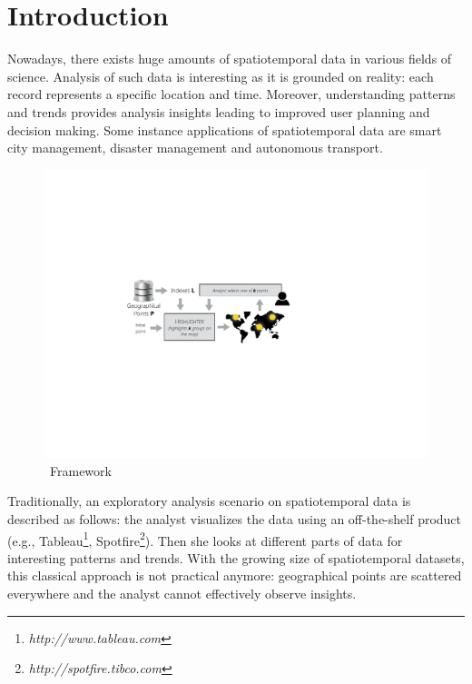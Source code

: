 \section{Introduction} 
Nowadays, there exists huge amounts of spatiotemporal data in various fields of science.
Analysis of such data is interesting as it is grounded
on reality: each record represents a specific location and time. Moreover, understanding patterns and trends provides analysis insights leading to improved user planning and decision making. Some instance applications of spatiotemporal data are smart city management, disaster management and autonomous transport.

\begin{figure}[t]
  \centering
  \includegraphics[width=\columnwidth]{figs/framework}
\caption{\framework\ Framework}
\label{fig:framework}
\vspace{-10pt}
\end{figure}

Traditionally, an exploratory analysis scenario on spatiotemporal data is described as follows: the analyst visualizes the data using an off-the-shelf product (e.g., Tableau\footnote{\it http://www.tableau.com},
Spotfire\footnote{\it http://spotfire.tibco.com}). Then she looks at different parts of data for interesting patterns and trends. With the growing size of spatiotemporal datasets, this classical approach is not practical anymore: geographical points are scattered everywhere and the analyst cannot effectively observe insights.

